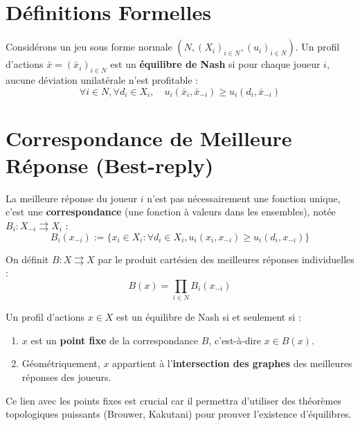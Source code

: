 \section{Définitions Formelles}

\begin{definition}
Considérons un jeu sous forme normale $(N, (X_i)_{i \in N}, (u_i)_{i \in N})$. Un profil d'actions $\bar{x} = (\bar{x}_i)_{i \in N}$ est un \textbf{équilibre de Nash} si pour chaque joueur $i$, aucune déviation unilatérale n'est profitable :
\[ \forall i \in N, \forall d_i \in X_i, \quad u_i(\bar{x}_i, \bar{x}_{-i}) \ge u_i(d_i, \bar{x}_{-i}) \]
\end{definition}

\section{Correspondance de Meilleure Réponse (Best-reply)}

\begin{definition}
La meilleure réponse du joueur $i$ n'est pas nécessairement une fonction unique, c'est une \textbf{correspondance} (une fonction à valeurs dans les ensembles), notée $B_i : X_{-i} \rightrightarrows X_i$ :
$$B_i(x_{-i}) := \{ x_i \in X_i : \forall d_i \in X_i, u_i(x_i, x_{-i}) \ge u_i(d_i, x_{-i}) \}$$
\end{definition}

\begin{definition}
On définit $B : X \rightrightarrows X$ par le produit cartésien des meilleures réponses individuelles :
$$B(x) = \prod_{i \in N} B_i(x_{-i})$$
\end{definition}

\begin{theoreme}
Un profil d'actions $x \in X$ est un équilibre de Nash si et seulement si :
\begin{enumerate}
    \item $x$ est un \textbf{point fixe} de la correspondance $B$, c'est-à-dire $x \in B(x)$.
    \item Géométriquement, $x$ appartient à l'\textbf{intersection des graphes} des meilleures réponses des joueurs.
\end{enumerate}
\end{theoreme}
Ce lien avec les points fixes est crucial car il permettra d'utiliser des théorèmes topologiques puissants (Brouwer, Kakutani) pour prouver l'existence d'équilibres.

